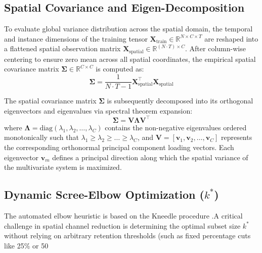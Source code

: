 \subsection{Spatial Covariance and Eigen-Decomposition}
\noindent
To evaluate global variance distribution across the spatial domain, the temporal and instance dimensions of the training tensor $\mathbf{X}_{\text{train}} \in \mathbb{R}^{N \times C \times T}$ are reshaped into a flattened spatial observation matrix $\mathbf{X}_{\text{spatial}} \in \mathbb{R}^{(N \cdot T) \times C}$. After column-wise centering to ensure zero mean across all spatial coordinates, the empirical spatial covariance matrix $\mathbf{\Sigma} \in \mathbb{R}^{C \times C}$ is computed as:
\begin{equation}
    \mathbf{\Sigma} = \frac{1}{N \cdot T - 1} \mathbf{X}_{\text{spatial}}^\top \mathbf{X}_{\text{spatial}}
\end{equation}

\noindent
The spatial covariance matrix $\mathbf{\Sigma}$ is subsequently decomposed into its orthogonal eigenvectors and eigenvalues via spectral theorem expansion:
\begin{equation}
    \mathbf{\Sigma} = \mathbf{V} \mathbf{\Lambda} \mathbf{V}^\top
\end{equation}
where $\mathbf{\Lambda} = \text{diag}(\lambda_1, \lambda_2, \dots, \lambda_C)$ contains the non-negative eigenvalues ordered monotonically such that $\lambda_1 \ge \lambda_2 \ge \dots \ge \lambda_C$, and $\mathbf{V} = [\mathbf{v}_1, \mathbf{v}_2, \dots, \mathbf{v}_C]$ represents the corresponding orthonormal principal component loading vectors. Each eigenvector $\mathbf{v}_m$ defines a principal direction along which the spatial variance of the multivariate system is maximized.

\subsection{Dynamic Scree-Elbow Optimization ($k^*$)}
\noindent
The automated elbow heuristic is based on the Kneedle procedure
\citep{satopaa2011kneedle}.A critical challenge in spatial channel reduction is determining the optimal subset size $k^*$ without relying on arbitrary retention thresholds (such as fixed percentage cuts like 25\% or 50%

